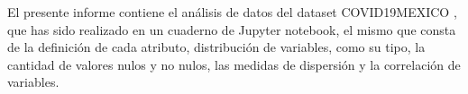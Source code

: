 \documentclass[
	spanish, %
	a4paper, oneside
]{article}
\begin{document}
	
\templatePortrait

\templatePagecfg

\begin{abstractd}
El presente informe contiene el análisis de datos del dataset COVID19MEXICO \cite{Salud} , que has sido realizado en un cuaderno de Jupyter notebook, el mismo que consta de la definición de cada atributo, distribución de variables, como su tipo, la cantidad de valores nulos  y no nulos, las medidas de dispersión y la correlación de variables.
\end{abstractd}

\templateIndex

\templateFinalcfg



\end{document}
